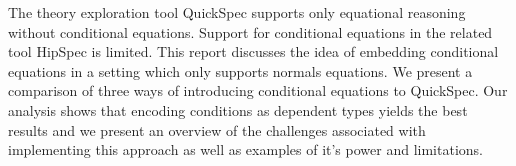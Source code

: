 The theory exploration tool QuickSpec
supports only equational reasoning without
conditional equations. Support for conditional
equations in the related tool HipSpec is limited.
This report discusses the idea of embedding conditional
equations in a setting which only supports normals equations.
We present a comparison of three ways of introducing
conditional equations to QuickSpec.
Our analysis shows that encoding conditions as dependent
types yields the best results and we present an overview of
the challenges associated with implementing
this approach as well as examples
of it's power and limitations.
